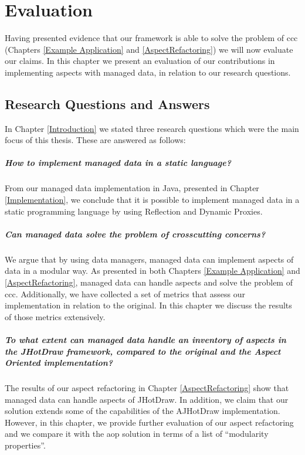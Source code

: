 
\chapter{Evaluation}\label{Evaluation}

Having presented evidence that our framework is able to solve the problem of \ac{ccc} (Chapters \ref{Example Application} and \ref{AspectRefactoring}) we will now evaluate our claims.
In this chapter we present an evaluation of our contributions in implementing aspects with managed data, in relation to our research questions.

\section{Research Questions and Answers}\label{Research Questions and Answers}
In Chapter \ref{Introduction} we stated three research questions which were the main focus of this thesis.
These are answered as follows:

\paragraph{How to implement managed data in a static language?}
From our managed data implementation in Java, presented in Chapter \ref{Implementation}, we conclude that it is possible to implement managed data in a static programming language by using Reflection and Dynamic Proxies.

\paragraph{Can managed data solve the problem of crosscutting concerns?}
We argue that by using data managers, managed data can implement aspects of data in a modular way.
As presented in both Chapters \ref{Example Application} and \ref{AspectRefactoring}, managed data can handle aspects and solve the problem of \acrlong{ccc}.
Additionally, we have collected a set of metrics that assess our implementation in relation to the original.
In this chapter we discuss the results of those metrics extensively.

\paragraph{To what extent can managed data handle an inventory of aspects in the JHotDraw framework, compared to the original and the Aspect Oriented implementation?}
The results of our aspect refactoring in Chapter \ref{AspectRefactoring} show that managed data can handle aspects of JHotDraw. 
In addition, we claim that our solution extends some of the capabilities of the AJHotDraw implementation.
However, in this chapter, we provide further evaluation of our aspect refactoring and we compare it with the \acrlong{aop} solution in terms of a list of ``modularity properties''.

